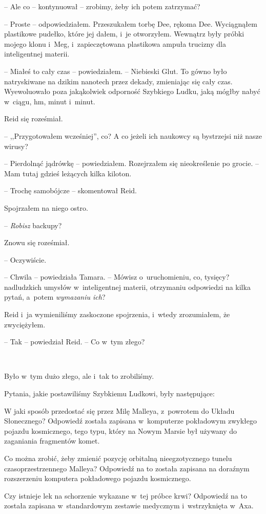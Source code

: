 \documentclass[oneside,polish,11pt,sfheadings]{mwbk}
\begin{document}
-- Ale co -- kontynuował -- zrobimy, żeby ich potem zatrzymać?

-- Proste -- odpowiedziałem. Przeszukałem torbę Dee, rękoma Dee.
Wyciągnąłem plastikowe pudełko, które jej dałem, i~je otworzyłem.
Wewnątrz były próbki mojego klonu i~Meg, i~zapieczętowana plastikowa
ampuła trucizny dla inteligentnej materii.

-- Miałeś to cały czas -- powiedziałem. -- Niebieski Glut. To gówno było
natryskiwane na dzikim nanotech przez dekady, zmieniając się cały czas.
Wyewoluowało poza jakąkolwiek odporność Szybkiego Ludku, jaką mógłby
nabyć w~ciągu, hm, minut i~minut.

Reid się roześmiał. 

-- ,,Przygotowałem wcześniej'', co? A co jeżeli ich naukowcy są bystrzejsi niż nasze wirusy?

-- Pierdolnąć jądrówkę -- powiedziałem. Rozejrzałem się nieokreślenie po
grocie. -- Mam tutaj gdzieś leżących kilka kiloton.

-- Trochę samobójcze -- skomentował Reid.

Spojrzałem na niego ostro.

-- \emph{Robisz} backupy?

Znowu się roześmiał. 

-- Oczywiście.

-- Chwila -- powiedziała Tamara. -- Mówisz o~uruchomieniu, co, tysięcy?
nadludzkich umysłów w~inteligentnej materii, otrzymaniu odpowiedzi na
kilka pytań, a~potem \emph{wymazaniu ich}?

Reid i~ja wymieniliśmy zaskoczone spojrzenia, i~wtedy zrozumiałem, że
zwyciężyłem.

-- Tak -- powiedział Reid. -- Co w~tym złego?

~

Było w~tym dużo złego, ale i~tak to zrobiliśmy.

Pytania, jakie postawiliśmy Szybkiemu Ludkowi, były następujące:

W jaki sposób przedostać się przez Milę Malleya, z~powrotem do Układu
Słonecznego? Odpowiedź została zapisana w~komputerze pokładowym zwykłego pojazdu
kosmicznego, tego typu, który na Nowym Marsie był używany do zaganiania
fragmentów komet.

Co można zrobić, żeby zmienić pozycję orbitalną nieegzotycznego tunelu
czasoprzestrzennego Malleya? Odpowiedź na to została zapisana na doraźnym rozszerzeniu komputera
pokładowego pojazdu kosmicznego.

Czy istnieje lek na schorzenie wykazane w~tej próbce krwi? Odpowiedź na to została zapisana w~standardowym zestawie medycznym i~wstrzyknięta w~Axa.
\end{document}
